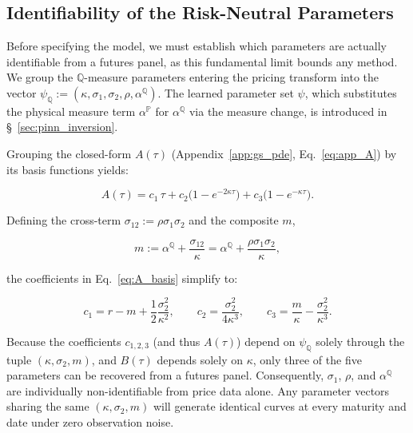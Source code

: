 \documentclass[11pt, a4paper]{article}
\newcommand{\meanrev}{\kappa}               %
\newcommand{\longrun}{\alpha}               %
\begin{document}
\subsection{Identifiability of the Risk-Neutral Parameters}
\label{sec:identifiability}
Before specifying the model, we must establish which parameters are actually identifiable from a futures panel, as this fundamental limit bounds any method. We group the $\mathbb{Q}$-measure parameters entering the pricing transform into the vector $\psi_{\mathbb{Q}} := (\meanrev, \sigma_1, \sigma_2, \rho, \longrun^{\mathbb{Q}})$. The learned parameter set $\psi$, which substitutes the physical measure term $\alpha^{\mathbb{P}}$ for $\alpha^{\mathbb{Q}}$ via the measure change, is introduced in \S~\ref{sec:pinn_inversion}.

Grouping the closed-form $A(\tau)$ (Appendix~\ref{app:gs_pde}, Eq.~\ref{eq:app_A}) by its basis functions yields:

\begin{equation}
  \label{eq:A_basis}
  A(\tau) = c_1\,\tau
          + c_2\big(1 - e^{-2\meanrev\tau}\big)
          + c_3\big(1 - e^{-\meanrev\tau}\big).
\end{equation}

Defining the cross-term $\sigma_{12} := \rho\sigma_1\sigma_2$ and the composite $m$,

\begin{equation}
  \label{eq:identified_composite}
  m := \longrun^{\mathbb{Q}} + \frac{\sigma_{12}}{\meanrev}
     = \longrun^{\mathbb{Q}} + \frac{\rho\sigma_1\sigma_2}{\meanrev},
\end{equation}

the coefficients in Eq.~\ref{eq:A_basis} simplify to:

\begin{equation}
  \label{eq:A_coeffs}
  c_1 = r - m + \frac{1}{2}\frac{\sigma_2^2}{\meanrev^2},
  \qquad
  c_2 = \frac{\sigma_2^2}{4\meanrev^3},
  \qquad
  c_3 = \frac{m}{\meanrev} - \frac{\sigma_2^2}{\meanrev^3}.
\end{equation}

Because the coefficients $c_{1,2,3}$ (and thus $A(\tau)$) depend on $\psi_{\mathbb{Q}}$ solely through the tuple $(\kappa, \sigma_2, m)$, and $B(\tau)$ depends solely on $\kappa$, only three of the five parameters can be recovered from a futures panel. Consequently, $\sigma_1$, $\rho$, and $\longrun^{\mathbb{Q}}$ are individually non-identifiable from price data alone. Any parameter vectors sharing the same $(\kappa, \sigma_2, m)$ will generate identical curves at every maturity and date under zero observation noise.
\end{document}
